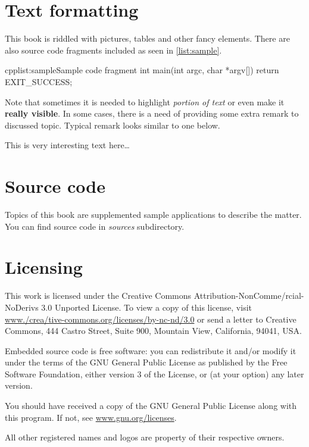 \section*{Text formatting}
This book is riddled with pictures, tables and other fancy elements. There are also source code fragments included as seen in \autoref{list:sample}.

\begin{fdoccode}{cpp}{list:sample}{Sample code fragment}
int main(int argc, char *argv[]) {
	return EXIT_SUCCESS;
}
\end{fdoccode}

Note that sometimes it is needed to highlight \emph{portion of text} or even make it \textbf{really visible}. In some cases, there is a need of providing some extra remark to discussed topic. Typical remark looks similar to one below.

\begin{fdocextra}
This is very interesting text here\ldots
\end{fdocextra}

\section*{Source code}
Topics of this book are supplemented sample applications to describe the matter. You can find source code in \textit{sources} subdirectory.

\section*{Licensing}
This work is licensed under the Creative Commons Attribution-NonComme\-/rcial-NoDerivs 3.0 Unported License. To view a copy of this license, visit \href{http://www.creativecommons.org/licenses/by-nc-nd/3.0}{www.\-/crea\-/tive-commons.org/licenses/by-nc-nd/3.0} or send a letter to Creative Commons, 444 Castro Street, Suite 900, Mountain View, California, 94041, USA.

Embedded \cpp source code is free software: you can redistribute it and/or modify it under the terms of the GNU General Public License as published by the Free Software Foundation, either version 3 of the License, or (at your option) any later version.

You should have received a copy of the GNU General Public License along with this program. If not, see \href{http://www.gnu.org/licenses}{www.gnu.org/licenses}.

All other registered names and logos are property of their respective owners.